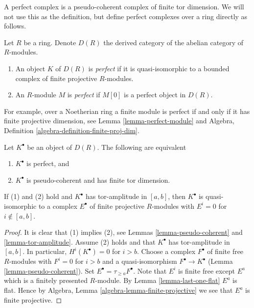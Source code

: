 \noindent
A perfect complex is a pseudo-coherent complex of finite tor dimension.
We will not use this as the definition, but define perfect complexes
over a ring directly as follows.

\begin{definition}
\label{definition-perfect}
Let $R$ be a ring. Denote $D(R)$ the derived category of the abelian
category of $R$-modules.
\begin{enumerate}
\item An object $K$ of $D(R)$ is {\it perfect} if it is quasi-isomorphic
to a bounded complex of finite projective $R$-modules.
\item An $R$-module $M$ is {\it perfect} if $M[0]$ is a perfect object
in $D(R)$.
\end{enumerate}
\end{definition}

\noindent
For example, over a Noetherian ring a finite module is perfect if and
only if it has finite projective dimension, see
Lemma \ref{lemma-perfect-module}
and Algebra, Definition \ref{algebra-definition-finite-proj-dim}.

\begin{lemma}
\label{lemma-perfect}
Let $K^\bullet$ be an object of $D(R)$. The following are equivalent
\begin{enumerate}
\item $K^\bullet$ is perfect, and
\item $K^\bullet$ is pseudo-coherent and has finite tor dimension.
\end{enumerate}
If (1) and (2) hold and $K^\bullet$ has tor-amplitude
in $[a, b]$, then $K^\bullet$ is quasi-isomorphic to a complex
$E^\bullet$ of finite projective $R$-modules with $E^i = 0$
for $i \not \in [a, b]$.
\end{lemma}

\begin{proof}
It is clear that (1) implies (2), see
Lemmas \ref{lemma-pseudo-coherent} and \ref{lemma-tor-amplitude}.
Assume (2) holds and that $K^\bullet$ has tor-amplitude in $[a, b]$.
In particular, $H^i(K^\bullet) = 0$ for $i > b$.
Choose a complex $F^\bullet$ of finite free $R$-modules with
$F^i = 0$ for $i > b$ and a quasi-isomorphism $F^\bullet \to K^\bullet$
(Lemma \ref{lemma-pseudo-coherent}).
Set $E^\bullet = \tau_{\geq a}F^\bullet$. Note that $E^i$ is finite
free except $E^a$ which is a finitely presented $R$-module. By
Lemma \ref{lemma-last-one-flat} $E^a$ is flat. Hence by
Algebra, Lemma \ref{algebra-lemma-finite-projective}
we see that $E^a$ is finite projective.
\end{proof}


